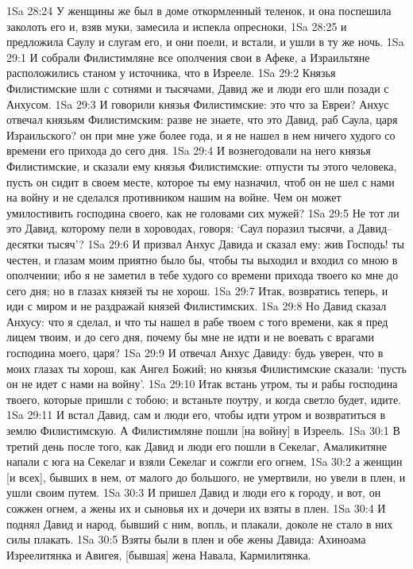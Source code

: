 1Sa 28:24  У женщины же был в доме откормленный теленок, и она поспешила заколоть его и, взяв муки, замесила и испекла опресноки,
1Sa 28:25  и предложила Саулу и слугам его, и они поели, и встали, и ушли в ту же ночь.
1Sa 29:1  И собрали Филистимляне все ополчения свои в Афеке, а Израильтяне расположились станом у источника, что в Изрееле.
1Sa 29:2  Князья Филистимские шли с сотнями и тысячами, Давид же и люди его шли позади с Анхусом.
1Sa 29:3  И говорили князья Филистимские: это что за Евреи? Анхус отвечал князьям Филистимским: разве не знаете, что это Давид, раб Саула, царя Израильского? он при мне уже более года, и я не нашел в нем ничего худого со времени его прихода до сего дня.
1Sa 29:4  И вознегодовали на него князья Филистимские, и сказали ему князья Филистимские: отпусти ты этого человека, пусть он сидит в своем месте, которое ты ему назначил, чтоб он не шел с нами на войну и не сделался противником нашим на войне. Чем он может умилостивить господина своего, как не головами сих мужей?
1Sa 29:5  Не тот ли это Давид, которому пели в хороводах, говоря: `Саул поразил тысячи, а Давид--десятки тысяч'?
1Sa 29:6  И призвал Анхус Давида и сказал ему: жив Господь! ты честен, и глазам моим приятно было бы, чтобы ты выходил и входил со мною в ополчении; ибо я не заметил в тебе худого со времени прихода твоего ко мне до сего дня; но в глазах князей ты не хорош.
1Sa 29:7  Итак, возвратись теперь, и иди с миром и не раздражай князей Филистимских.
1Sa 29:8  Но Давид сказал Анхусу: что я сделал, и что ты нашел в рабе твоем с того времени, как я пред лицем твоим, и до сего дня, почему бы мне не идти и не воевать с врагами господина моего, царя?
1Sa 29:9  И отвечал Анхус Давиду: будь уверен, что в моих глазах ты хорош, как Ангел Божий; но князья Филистимские сказали: `пусть он не идет с нами на войну'.
1Sa 29:10  Итак встань утром, ты и рабы господина твоего, которые пришли с тобою; и встаньте поутру, и когда светло будет, идите.
1Sa 29:11  И встал Давид, сам и люди его, чтобы идти утром и возвратиться в землю Филистимскую. А Филистимляне пошли [на войну] в Изреель.
1Sa 30:1  В третий день после того, как Давид и люди его пошли в Секелаг, Амаликитяне напали с юга на Секелаг и взяли Секелаг и сожгли его огнем,
1Sa 30:2  а женщин [и всех], бывших в нем, от малого до большого, не умертвили, но увели в плен, и ушли своим путем.
1Sa 30:3  И пришел Давид и люди его к городу, и вот, он сожжен огнем, а жены их и сыновья их и дочери их взяты в плен.
1Sa 30:4  И поднял Давид и народ, бывший с ним, вопль, и плакали, доколе не стало в них силы плакать.
1Sa 30:5  Взяты были в плен и обе жены Давида: Ахиноама Изреелитянка и Авигея, [бывшая] жена Навала, Кармилитянка.
